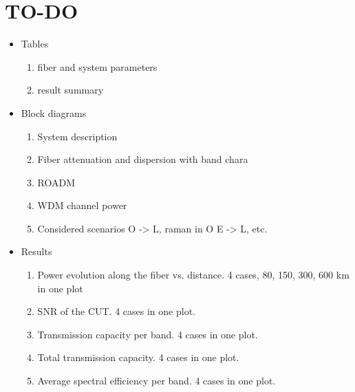 \documentclass[journal]{IEEEtran}
\begin{document}
%
%
\pagebreak
\section{TO-DO}\label{Sec:Conclusions}
\begin{itemize}
    \item Tables
    \begin{enumerate}
        \item fiber and system parameters
        \item result summary
    \end{enumerate}
    \item Block diagrams
    \begin{enumerate}
        \item System description
        \item Fiber attenuation and dispersion with band chara
        \item ROADM
        \item WDM channel power 
        \item Considered scenarios O -> L, raman in O E -> L, etc.
    \end{enumerate}
    \item Results
    \begin{enumerate}
        \item Power evolution along the fiber vs. distance. 4 cases, 80, 150, 300, 600 km in one plot
        \item SNR of the CUT. 4 cases in one plot.
        \item Transmission capacity per band. 4 cases in one plot.
        \item Total transmission capacity. 4 cases in one plot.
        \item Average spectral efficiency per band. 4 cases in one plot.
    \end{enumerate}
\end{itemize}



\end{document}
